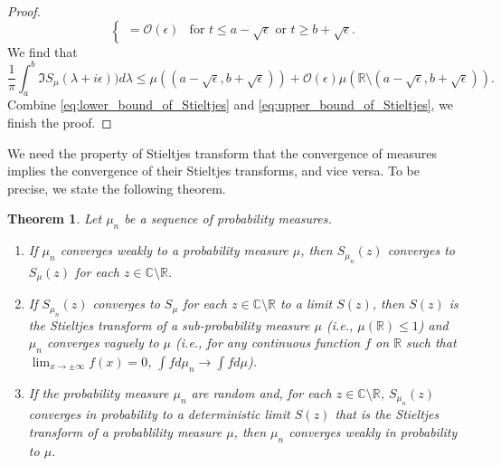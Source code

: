 \documentclass[11pt, a4paper]{article}
\numberwithin{equation}{section}
\newcommand{\bigO}{\mathcal{O}}
\newcommand{\compC}{\mathbb{C}}
\newcommand{\realR}{\mathbb{R}}
\newcommand{\ie}{i.e.}
\newtheorem{thm}{Theorem}
\theoremstyle{definition}
\theoremstyle{remark}
\begin{document}
\begin{proof}
\begin{equation}
\begin{cases}
      = \bigO(\epsilon) & \text{for $t \leq a - \sqrt{\epsilon}$ or $t \geq b + \sqrt{\epsilon}$}.
    \end{cases}
  \end{equation}
  We find that
  \begin{equation} \label{eq:upper_bound_of_Stieltjes}
    \frac{1}{\pi} \int^b_a \Im S_{\mu}(\lambda + i\epsilon)) d\lambda \leq \mu((a - \sqrt{\epsilon}, b + \sqrt{\epsilon})) + \bigO(\epsilon) \mu(\realR \setminus (a - \sqrt{\epsilon}, b + \sqrt{\epsilon})).
  \end{equation}
  Combine \eqref{eq:lower_bound_of_Stieltjes} and \eqref{eq:upper_bound_of_Stieltjes}, we finish the proof.
\end{proof}

We need the property of Stieltjes transform that the convergence of measures implies the convergence of their Stieltjes transforms, and vice versa. To be precise, we state the following theorem.

\begin{thm} \label{thm:Stieltjes_trans_limit}
  Let $\mu_n$ be a sequence of probability measures.
  \begin{enumerate}
  \item \label{enu:Stieltjes_conv:1}
    If $\mu_n$ converges weakly to a probability measure $\mu$, then $S_{\mu_n}(z)$ converges to $S_{\mu}(z)$ for each $z \in \compC \setminus \realR$.
  \item \label{enu:Stieltjes_conv:2}
    If $S_{\mu_n}(z)$ converges to $S_{\mu}$ for each $z \in \compC \setminus \realR$ to a limit $S(z)$, then $S(z)$ is the Stieltjes transform of a sub-probability measure $\mu$ (\ie, $\mu(\realR) \leq 1$) and $\mu_n$ converges vaguely to $\mu$ (\ie, for any continuous function $f$ on $\realR$ such that $\lim_{x \to \pm \infty} f(x) = 0$, $\int f d\mu_n \to \int f d\mu$).
  \item \label{enu:Stieltjes_conv:3}
    If the probability measure $\mu_n$ are random and, for each $z \in \compC \setminus \realR$, $S_{\mu_n}(z)$ converges in probability to a deterministic limit $S(z)$ that is the Stieltjes transform of a probablility measure $\mu$, then $\mu_n$ converges weakly in probability to $\mu$.
  \end{enumerate}
\end{thm}
\end{document}
